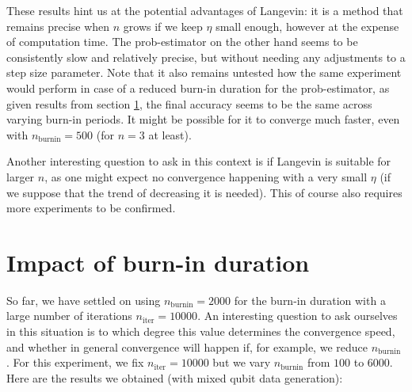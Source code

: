 \documentclass[12pt]{memoir}
\newcommand{\nitern}[1]{$n_{\text{iter}}=#1$}
\newcommand{\nburninn}[1]{$n_{\text{burnin}}=#1$}
\newcommand{\nburnin}[0]{$n_{\text{burnin}} $ }
\begin{document}
These results hint us at the potential advantages of Langevin: it is a method that remains precise when $n$ grows if we keep $\eta$ small enough, however at the expense of computation time. The prob-estimator on the other hand seems to be consistently slow and relatively precise, but without needing any adjustments to a step size parameter. Note that it also remains untested how the same experiment would perform in case of a reduced burn-in duration for the prob-estimator, as given results from section \ref{section:comp-burnin}, the final accuracy seems to be the same across varying burn-in periods. It might be possible for it to converge much faster, even with \nburninn{500} (for $n=3$ at least).\medbreak

Another interesting question to ask in this context is if Langevin is suitable for larger $n$, as one might expect no convergence happening with a very small $\eta$ (if we suppose that the trend of decreasing it is needed). This of course also requires more experiments to be confirmed.

\section{Impact of burn-in duration}\label{section:comp-burnin}
So far, we have settled on using \nburninn{2000} for the burn-in duration with a large number of iterations \nitern{10000}. An interesting question to ask ourselves in this situation is to which degree this value determines the convergence speed, and whether in general convergence will happen if, for example, we reduce \nburnin. For this experiment, we fix \nitern{10000} but we vary \nburnin from $100$ to $6000$. Here are the results we obtained (with mixed qubit data generation):
\end{document}
